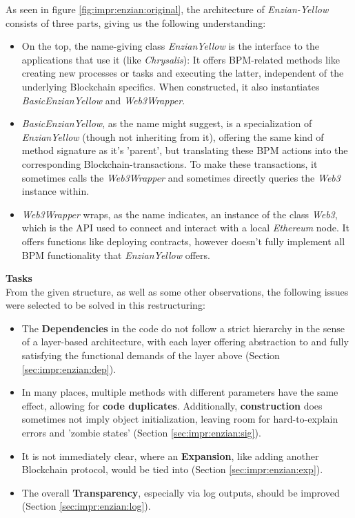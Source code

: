 As seen in figure \ref{fig:impr:enzian:original}, the architecture of \emph{Enzian-Yellow} consists of three parts, giving us the following understanding:
\begin{itemize}
    \item On the top, the name-giving class \emph{EnzianYellow} is the interface to the applications that use it (like \emph{Chrysalis}): It offers BPM-related methods like creating new processes or tasks and executing the latter, independent of the underlying Blockchain specifics. When constructed, it also instantiates \emph{BasicEnzianYellow} and \emph{Web3Wrapper}.
    \item \emph{BasicEnzianYellow}, as the name might suggest, is a specialization of \emph{EnzianYellow} (though not inheriting from it), offering the same kind of method signature as it's 'parent', but translating these BPM actions into the corresponding Blockchain-transactions. To make these transactions, it sometimes calls the \emph{Web3Wrapper} and sometimes directly queries the \emph{Web3} instance within.
    \item \emph{Web3Wrapper} wraps, as the name indicates, an instance of the class \emph{Web3}, which is the API used to connect and interact with a local \emph{Ethereum} node. It offers functions like deploying contracts, however doesn't fully implement all BPM functionality that \emph{EnzianYellow} offers.
\end{itemize}

\textbf{Tasks} \\[0.2em]
From the given structure, as well as some other observations, the following issues were selected to be solved in this restructuring:
\begin{itemize}
\nopagebreak
    \item The \textbf{Dependencies} in the code do not follow a strict hierarchy in the sense of a layer-based architecture, with each layer offering abstraction to and fully satisfying the functional demands of the layer above (Section \ref{sec:impr:enzian:dep}).
    \item In many places, multiple methods with different parameters have the same effect, allowing for \textbf{code duplicates}. Additionally, \textbf{construction} does sometimes not imply object initialization, leaving room for hard-to-explain errors and 'zombie states' (Section \ref{sec:impr:enzian:sig}).
    \item It is not immediately clear, where an \textbf{Expansion}, like adding another Blockchain protocol, would be tied into (Section \ref{sec:impr:enzian:exp}). 
    \item The overall \textbf{Transparency}, especially via log outputs, should be improved (Section \ref{sec:impr:enzian:log}).
\end{itemize}

